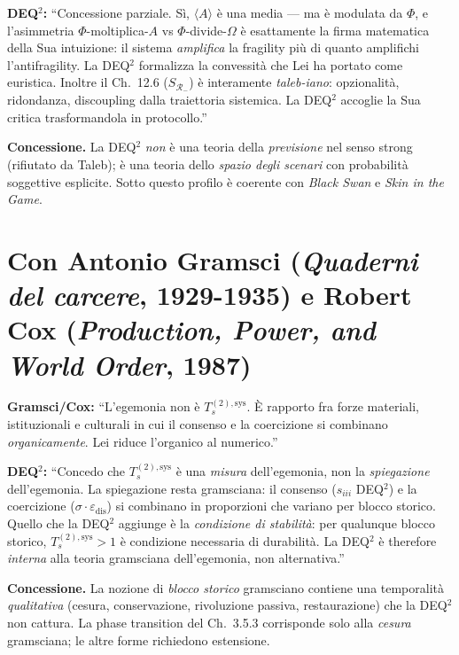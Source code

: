 \textbf{DEQ$^2$:} ``Concessione parziale. Sì, \(\langle A\rangle\) è una
media --- ma è modulata da \(\Phi\), e l'asimmetria
\(\Phi\)-moltiplica-\(A\) vs \(\Phi\)-divide-\(\Omega\) è esattamente la
firma matematica della Sua intuizione: il sistema \emph{amplifica} la
fragility più di quanto amplifichi l'antifragility. La DEQ$^2$ formalizza
la convessità che Lei ha portato come euristica. Inoltre il Ch.~12.6
(\(S_{\mathcal{R}_-}\)) è interamente \emph{taleb-iano}: opzionalità,
ridondanza, discoupling dalla traiettoria sistemica. La DEQ$^2$
accoglie la Sua critica trasformandola in protocollo.''

\textbf{Concessione.} La DEQ$^2$ \emph{non} è una teoria della
\emph{previsione} nel senso strong (rifiutato da Taleb); è una teoria
dello \emph{spazio degli scenari} con probabilità soggettive esplicite.
Sotto questo profilo è coerente con \emph{Black Swan} e \emph{Skin in
the Game}.



\section{\texorpdfstring{Con Antonio Gramsci (\emph{Quaderni del
carcere}, 1929-1935) e Robert Cox (\emph{Production, Power, and World
Order},
1987)}{Con Antonio Gramsci (Quaderni del carcere, 1929-1935) e Robert Cox (Production, Power, and World Order, 1987)}}\label{con-antonio-gramsci-quaderni-del-carcere-1929-1935-e-robert-cox-production-power-and-world-order-1987}

\textbf{Gramsci/Cox:} ``L'egemonia non è \(T_s^{(2),\text{sys}}\). È
rapporto fra forze materiali, istituzionali e culturali in cui il
consenso e la coercizione si combinano \emph{organicamente}. Lei riduce
l'organico al numerico.''

\textbf{DEQ$^2$:} ``Concedo che \(T_s^{(2),\text{sys}}\) è una
\emph{misura} dell'egemonia, non la \emph{spiegazione} dell'egemonia. La
spiegazione resta gramsciana: il consenso (\(s_{iii}\) DEQ$^2$) e la
coercizione (\(\sigma \cdot \varepsilon_{\text{dis}}\)) si combinano in
proporzioni che variano per blocco storico. Quello che la DEQ$^2$ aggiunge
è la \emph{condizione di stabilità}: per qualunque blocco storico,
\(T_s^{(2),\text{sys}} > 1\) è condizione necessaria di durabilità. La
DEQ$^2$ è therefore \emph{interna} alla teoria gramsciana dell'egemonia, non
alternativa.''

\textbf{Concessione.} La nozione di \emph{blocco storico} gramsciano
contiene una temporalità \emph{qualitativa} (cesura, conservazione,
rivoluzione passiva, restaurazione) che la DEQ$^2$ non cattura. La
phase transition del Ch.~3.5.3 corrisponde solo alla \emph{cesura}
gramsciana; le altre forme richiedono estensione.




